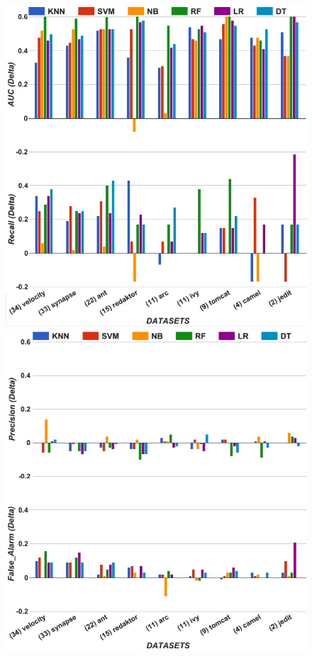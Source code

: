 \documentclass[10pt,conference]{IEEEtran}
\theoremstyle{break}
\theoremstyle{break}
\begin{document}
\begin{figure}[!t]
\begin{minipage}{.5\linewidth}
\centering
        \includegraphics[width=.95\linewidth]{./fig/AUC_recall_tuned.png}
    \end{minipage}%
\begin{minipage}{.5\linewidth}
        \centering
        \includegraphics[width=.95\linewidth]{./fig/prec_pf_tuned.png}
    \end{minipage}%
    

\end{figure}
\end{document}
